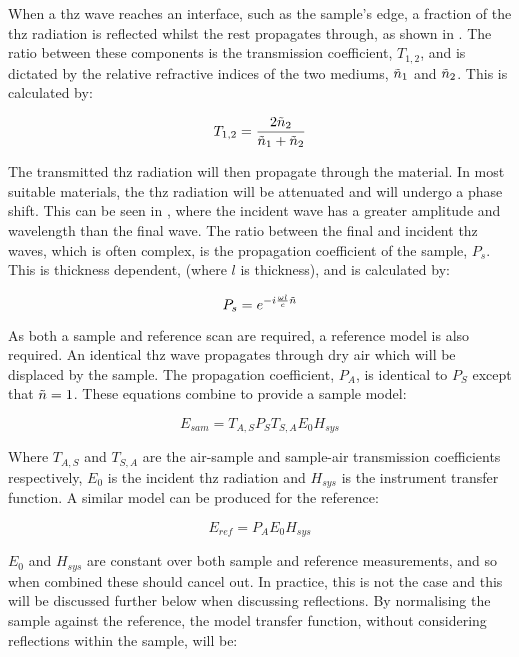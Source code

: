 When a \acrshort{thz} wave reaches an interface, such as the sample’s edge, a fraction of the \acrshort{thz} radiation is reflected whilst the rest propagates through, as shown in . The ratio between these components is the transmission coefficient, \(T_{1,2}\), and is dictated by the relative refractive indices of the two mediums, \(\Tilde{n}_1\) and \(\Tilde{n}_2\). This is calculated by:

\begin{equation}
T_{1,2} = \frac{2\Tilde{n}_2}{\Tilde{n}_1 + \Tilde{n}_2}
\end{equation}

The transmitted \acrshort{thz} radiation will then propagate through the material. In most suitable materials, the \acrshort{thz} radiation will be attenuated and will undergo a phase shift. This can be seen in , where the incident wave has a greater amplitude and wavelength than the final wave. The ratio between the final and incident \acrshort{thz} waves, which is often complex, is the propagation coefficient of the sample, \(P_s\). This is thickness dependent, (where \(l\) is thickness), and is calculated by:

\begin{equation}
P_s = e^{-i\frac{\omega l}{c} \Tilde{n}}
\end{equation}

As both a sample and reference scan are required, a reference model is also required. An identical \acrshort{thz} wave propagates through dry air which will be displaced by the sample. The propagation coefficient, \(P_A\), is identical to \(P_S\) except that \(\Tilde{n} = 1\). These equations combine to provide a sample model:

\begin{equation}
E_{sam} = T_{A,S} P_S T_{S,A} E_0 H_{sys}
\end{equation}

Where \(T_{A,S}\) and \(T_{S,A}\) are the air-sample and sample-air transmission coefficients respectively, \(E_0\) is the incident \acrshort{thz} radiation and \(H_{sys}\) is the instrument transfer function. A similar model can be produced for the reference:

\begin{equation}
E_{ref} = P_A E_0 H_{sys}
\end{equation}

\(E_0\) and \(H_{sys}\) are constant over both sample and reference measurements, and so when combined these should cancel out. In practice, this is not the case and this will be discussed further below when discussing reflections. By normalising the sample against the reference, the model transfer function, without considering reflections within the sample, will be:


